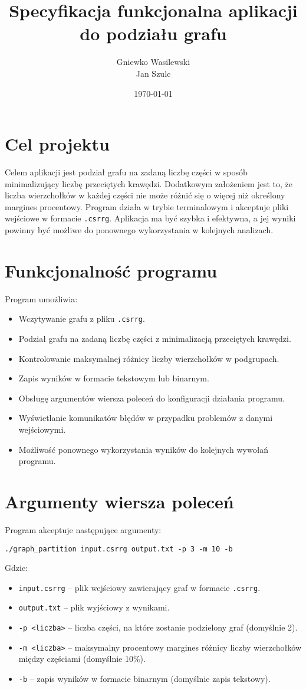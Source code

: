 \documentclass{article}
\title{Specyfikacja funkcjonalna aplikacji do podziału grafu}
\author{Gniewko Wasilewski\\Jan Szulc}
\date{\today}
\begin{document}
\maketitle

\section{Cel projektu}
Celem aplikacji jest podział grafu na zadaną liczbę części w sposób minimalizujący liczbę przeciętych krawędzi. Dodatkowym założeniem jest to, że liczba wierzchołków w każdej części nie może różnić się o więcej niż określony margines procentowy. Program działa w trybie terminalowym i akceptuje pliki wejściowe w formacie \texttt{.csrrg}. Aplikacja ma być szybka i efektywna, a jej wyniki powinny być możliwe do ponownego wykorzystania w kolejnych analizach.

\section{Funkcjonalność programu}
Program umożliwia:
\begin{itemize}
    \item Wczytywanie grafu z pliku \texttt{.csrrg}.
    \item Podział grafu na zadaną liczbę części z minimalizacją przeciętych krawędzi.
    \item Kontrolowanie maksymalnej różnicy liczby wierzchołków w podgrupach.
    \item Zapis wyników w formacie tekstowym lub binarnym.
    \item Obsługę argumentów wiersza poleceń do konfiguracji działania programu.
    \item Wyświetlanie komunikatów błędów w przypadku problemów z danymi wejściowymi.
    \item Możliwość ponownego wykorzystania wyników do kolejnych wywołań programu.
\end{itemize}

\newpage
\section{Argumenty wiersza poleceń}
Program akceptuje następujące argumenty:

\begin{verbatim}
./graph_partition input.csrrg output.txt -p 3 -m 10 -b
\end{verbatim}

Gdzie:
\begin{itemize}
    \item \texttt{input.csrrg} – plik wejściowy zawierający graf w formacie \texttt{.csrrg}.
    \item \texttt{output.txt} – plik wyjściowy z wynikami.
    \item \texttt{-p <liczba>} – liczba części, na które zostanie podzielony graf (domyślnie 2).
    \item \texttt{-m <liczba>} – maksymalny procentowy margines różnicy liczby wierzchołków między częściami (domyślnie 10\%).
    \item \texttt{-b} – zapis wyników w formacie binarnym (domyślnie zapis tekstowy).
\end{itemize}
\end{document}
